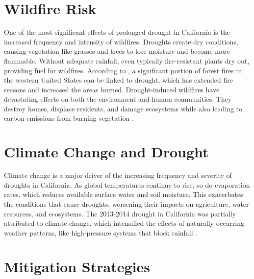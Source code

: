\documentclass[
]{book}
\theoremstyle{definition}
\theoremstyle{definition}
\theoremstyle{definition}
\theoremstyle{definition}
\theoremstyle{remark}
\begin{document}
\section{Wildfire Risk}\label{wildfire-risk}

One of the most significant effects of prolonged drought in California is the increased frequency and intensity of wildfires. Droughts create dry conditions, causing vegetation like grasses and trees to lose moisture and become more flammable. Without adequate rainfall, even typically fire-resistant plants dry out, providing fuel for wildfires. According to \citet{westerling2019}, a significant portion of forest fires in the western United States can be linked to drought, which has extended fire seasons and increased the areas burned. Drought-induced wildfires have devastating effects on both the environment and human communities. They destroy homes, displace residents, and damage ecosystems while also leading to carbon emissions from burning vegetation \citep{abatzoglou2016}.

\section{Climate Change and Drought}\label{climate-change-and-drought}

Climate change is a major driver of the increasing frequency and severity of droughts in California. As global temperatures continue to rise, so do evaporation rates, which reduces available surface water and soil moisture. This exacerbates the conditions that cause droughts, worsening their impacts on agriculture, water resources, and ecosystems. The 2013-2014 drought in California was partially attributed to climate change, which intensified the effects of naturally occurring weather patterns, like high-pressure systems that block rainfall \citep{mao2015}.

\section{Mitigation Strategies}\label{mitigation-strategies}
\end{document}
